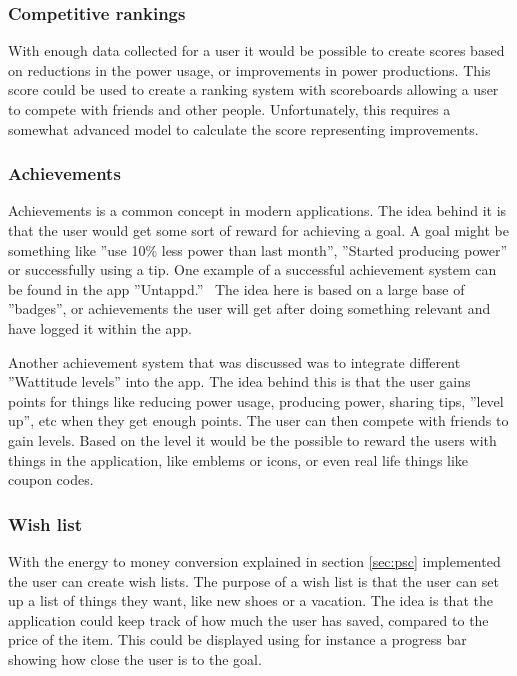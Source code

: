 \subsubsection{Competitive rankings}
With enough data collected for a user it would be possible to create scores based on reductions in the power usage, or improvements in power productions. This score could be used to create a ranking system with scoreboards allowing a user to compete with friends and other people. Unfortunately, this requires a somewhat advanced model to calculate the score representing improvements.


\subsubsection{Achievements}
Achievements is a common concept in modern applications. The idea behind it is that the user would get some sort of reward for achieving a goal. A goal might be something like ''use 10\% less power than last month'', ''Started producing power'' or successfully using a tip.
One example of a successful achievement system can be found in the app ''Untappd.''~\cite{untappd}
The idea here is based on a large base of ''badges'', or achievements the user will get after doing something relevant and have logged it within the app. 

Another achievement system that was discussed was to integrate different ''Wattitude levels'' into the app. The idea behind this is that the user gains points for things like reducing power usage, producing power, sharing tips, ''level up'', etc when they get enough points. The user can then compete with friends to gain levels. Based on the level it would be the possible to reward the users with things in the application, like emblems or icons, or even real life things like coupon codes.

\subsubsection{Wish list}
With the energy to money conversion explained in section \ref{sec:psc} implemented the user can create wish lists. 
The purpose of a wish list is that the user can set up a list of things they want, like new shoes or a vacation. The idea is that the application could keep track of how much the user has saved, compared to the price of the item. This could be displayed using for instance a progress bar showing how close the user is to the goal.

